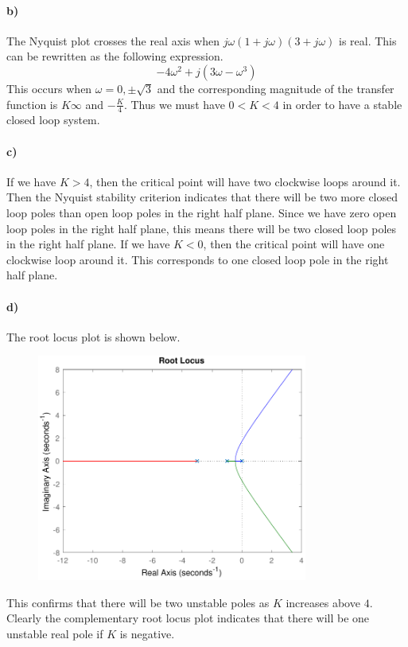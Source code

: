 \documentclass[12pt]{article}
\begin{document}
\paragraph{b)}

The Nyquist plot crosses the real axis when \(j\omega(1+j\omega)(3+j\omega)\) is real. This can be rewritten
as the following expression.
\[-4\omega^2+j(3\omega-\omega^3)\]
This occurs when \(\omega=0,\pm \sqrt{3}\) and the corresponding magnitude of the transfer function is
\(K\infty\) and \(-\frac{K}{4}\). Thus we must have \(0<K<4\) in order to have a stable closed loop system.

\paragraph{c)}

If we have \(K>4\), then the critical point will have two clockwise loops around it. Then the Nyquist stability
criterion indicates that there will be two more closed loop poles than open loop poles in the right half plane.
Since we have zero open loop poles in the right half plane, this means there will be two closed loop poles in
the right half plane. If we have \(K<0\), then the critical point will have one clockwise loop around it. This corresponds
to one closed loop pole in the right half plane.

\paragraph{d)}

The root locus plot is shown below.
\begin{figure}[H]
    \begin{center}
        \includegraphics[width=3.5in]{problem2d.pdf}
    \end{center}
\end{figure}
This confirms that there will be two unstable poles as \(K\) increases above \(4\). Clearly the complementary
root locus plot indicates that there will be one unstable real pole if \(K\) is negative.
\end{document}

